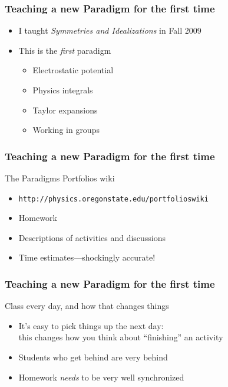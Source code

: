 \documentclass{beamer}
\begin{document}
\begin{frame}
  \frametitle{Teaching a new Paradigm for the first time}
  \begin{block}{}
    \begin{itemize}
    \item I taught \emph{Symmetries and Idealizations} in Fall 2009
    \item This is the \emph{first} paradigm
      \begin{itemize}
      \item Electrostatic potential
      \item Physics integrals
      \item Taylor expansions
      \item Working in groups
      \end{itemize}
    \end{itemize}
  \end{block}
\end{frame}


\begin{frame}[fragile]
  \frametitle{Teaching a new Paradigm for the first time}
  \begin{block}{The Paradigms Portfolios wiki}
    \begin{itemize}
    \item \verb!http://physics.oregonstate.edu/portfolioswiki!
    \item Homework
    \item Descriptions of activities and discussions
    \item Time estimates---shockingly accurate!
    \end{itemize}
  \end{block}
\end{frame}


\begin{frame}
  \frametitle{Teaching a new Paradigm for the first time}
  \begin{block}{Class every day, and how that changes things}
    \begin{itemize}
    \item It's easy to pick things up the next day: \\this changes how
      you think about ``finishing'' an activity
    \item Students who get behind are very behind
    \item Homework \emph{needs} to be very well synchronized
    \end{itemize}
  \end{block}
\end{frame}
\end{document}

